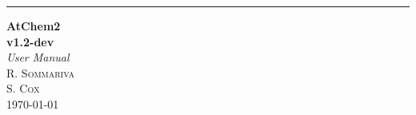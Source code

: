 \documentclass[11pt,a4paper]{report}
\begin{document}
%
%

\begin{titlepage}
  \raggedleft   %
  \rule{1pt}{\textheight}  %
  \hspace{0.05\textwidth}
  \parbox[b]{0.75\textwidth}{
    {\Huge\bfseries AtChem2\\[0.5\baselineskip] v1.2-dev}\\[2\baselineskip]  %
    {\LARGE\textit{User Manual}}\\[4\baselineskip]  %
    {\Large\textsc{R. Sommariva\\S. Cox}}  %
    \vspace{0.5\textheight}\\
    {\noindent \today}\\[\baselineskip]  %
    }

\end{titlepage}


\tableofcontents










\end{document}

